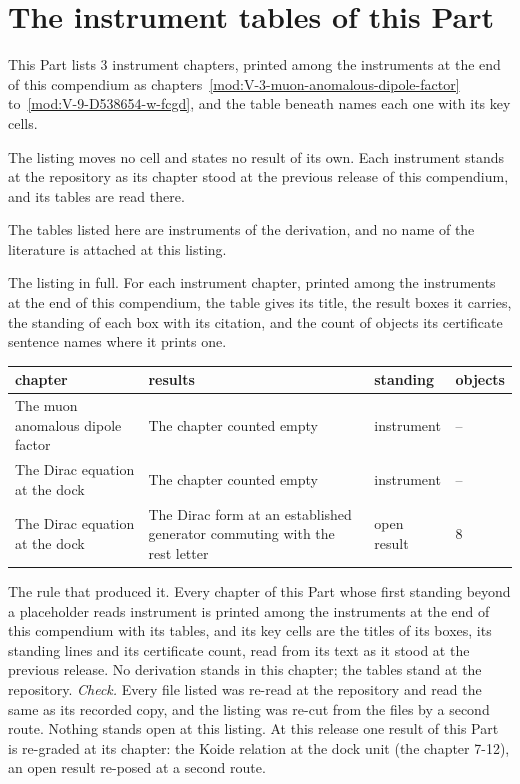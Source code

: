 \section{The instrument tables of this Part}\label{mod:VII-L-the-instrument-tables-at-the-repository}
\begin{chtable}\label{box:VII-L-the-instrument-tables-at-the-repository:1}
This Part lists 3 instrument chapters, printed among the instruments at the end of this compendium as chapters~\ref{mod:V-3-muon-anomalous-dipole-factor} to~\ref{mod:V-9-D538654-w-fcgd}, and the table beneath names each one with its key cells.
\end{chtable}
The listing moves no cell and states no result of its own. Each instrument stands at the repository as its chapter stood at the previous release of this compendium, and its tables are read there.
\begin{chbridge}
The tables listed here are instruments of the derivation, and no name of the literature is attached at this listing.
\end{chbridge}
\begin{chproof}[instrument]
The listing in full. For each instrument chapter, printed among the instruments at the end of this compendium, the table gives its title, the result boxes it carries, the standing of each box with its citation, and the count of objects its certificate sentence names where it prints one.
{\small
\begin{longtable}{p{38mm}p{63mm}p{30mm}p{14mm}}
\hline
chapter & results & standing & objects \\
\hline
\endhead
The muon anomalous dipole factor & The chapter counted empty & instrument & -- \\
The Dirac equation at the dock & The chapter counted empty & instrument & -- \\
The Dirac equation at the dock & The Dirac form at an established generator commuting with the rest letter & open result & 8 \\
\hline
\end{longtable}
}
The rule that produced it. Every chapter of this Part whose first standing beyond a placeholder reads instrument is printed among the instruments at the end of this compendium with its tables, and its key cells are the titles of its boxes, its standing lines and its certificate count, read from its text as it stood at the previous release.
No derivation stands in this chapter; the tables stand at the repository.
\emph{Check.} Every file listed was re-read at the repository and read the same as its recorded copy, and the listing was re-cut from the files by a second route.
Nothing stands open at this listing. At this release one result of this Part is re-graded at its chapter: the Koide relation at the dock unit (the chapter 7-12), an open result re-posed at a second route.
\end{chproof}
\label{chend:VII-L-the-instrument-tables-at-the-repository}
